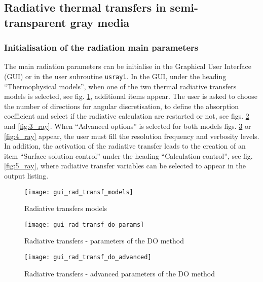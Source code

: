 {{\subsection{Radiative thermal transfers in semi-transparent gray media}
\subsubsection{Initialisation of the radiation main parameters}

The main radiation parameters can be initialise in the Graphical User Interface (GUI) or in the user subroutine \texttt{usray1}. In the GUI, under the heading ``Thermophysical models'', when one of the two thermal radiative transfers models is selected, see fig. \ref{fig:0_ray}, additional items appear. The user is asked to choose the number of directions for angular discretisation, to define the absorption coefficient and select if the radiative calculation are restarted or not, see figs. \ref{fig:1_ray} and \ref{fig:3_ray}. When ``Advanced options'' is selected for both models figs. \ref{fig:2_ray} or \ref{fig:4_ray} appear, the user must fill the resolution frequency and verbosity levels. In addition, the activation of the radiative transfer leads to the creation of an item ``Surface solution control'' under the heading ``Calculation control'', see fig. \ref{fig:5_ray}, where radiative transfer variables can be selected to appear in the output listing.

\begin{figure}[ht]
\begin{center}
\texttt{[image: gui\_rad\_transf\_models]}
\caption{Radiative transfers models}
\label{fig:0_ray}
\end{center}
\end{figure}

\begin{figure}[ht]
\begin{center}
\texttt{[image: gui\_rad\_transf\_do\_params]}
\caption{Radiative transfers - parameters of the DO method}
\label{fig:1_ray}
\end{center}
\end{figure}

\begin{figure}[ht]
\begin{center}
\texttt{[image: gui\_rad\_transf\_do\_advanced]}
\caption{Radiative transfers - advanced parameters of the DO method}
\label{fig:2_ray}
\end{center}
\end{figure}

}}
